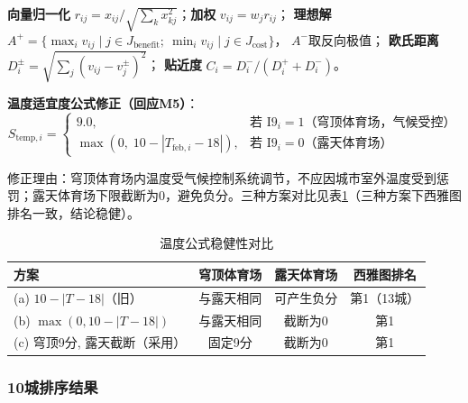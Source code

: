 \documentclass[12pt]{ctexart}
\begin{document}
\textbf{向量归一化} $r_{ij}=x_{ij}/\sqrt{\sum_k x_{kj}^2}$；\textbf{加权} $v_{ij}=w_j r_{ij}$；
\textbf{理想解} $A^+=\{ \max_i v_{ij}\mid j\in J_{\text{benefit}};\ \min_i v_{ij}\mid j\in J_{\text{cost}} \}$，
$A^-$取反向极值；
\textbf{欧氏距离} $D_i^\pm=\sqrt{\sum_j(v_{ij}-v_j^\pm)^2}$；
\textbf{贴近度} $C_i=D_i^-/(D_i^++D_i^-)$。

\textbf{温度适宜度公式修正（回应M5）}：
\begin{equation}
S_{\text{temp},i} =
\begin{cases}
9.0, & \text{若 } \text{I9}_i = 1 \text{（穹顶体育场，气候受控）} \\
\max\left(0,\; 10 - |T_{\text{feb},i} - 18| \right), & \text{若 } \text{I9}_i = 0 \text{（露天体育场）}
\end{cases}
\end{equation}

修正理由：穹顶体育场内温度受气候控制系统调节，不应因城市室外温度受到惩罚；露天体育场下限截断为0，避免负分。三种方案对比见表\ref{tab:temp_robustness}（三种方案下西雅图排名一致，结论稳健）。

\begin{table}[H]
\centering
\caption{温度公式稳健性对比}
\label{tab:temp_robustness}
\small
\begin{tabular}{lccc}
\toprule
\textbf{方案} & \textbf{穹顶体育场} & \textbf{露天体育场} & \textbf{西雅图排名} \\
\midrule
(a) $10-|T-18|$（旧） & 与露天相同 & 可产生负分 & 第1（13城） \\
(b) $\max(0,10-|T-18|)$ & 与露天相同 & 截断为0 & 第1 \\
(c) 穹顶9分, 露天截断（采用） & 固定9分 & 截断为0 & 第1 \\
\bottomrule
\end{tabular}
\end{table}

\subsubsection{10城排序结果}
\end{document}
